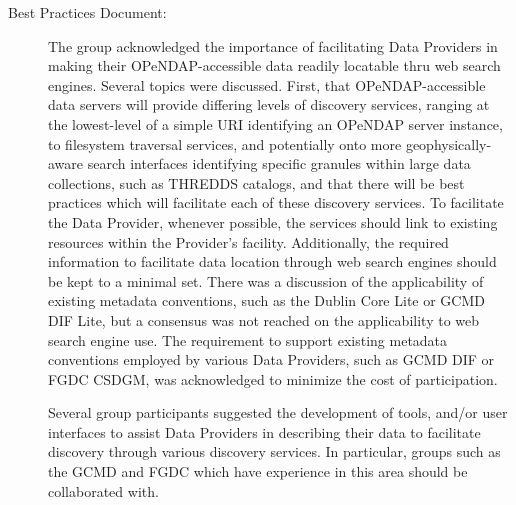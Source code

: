 \begin{description}
\item[Best Practices Document:]  The group acknowledged the importance of 
  facilitating Data Providers in making their OPeNDAP-accessible data
  readily locatable thru web search engines.  Several topics were
  discussed.  First, that OPeNDAP-accessible data servers will provide
  differing levels of discovery services, ranging at the lowest-level
  of a simple URI identifying an OPeNDAP server instance, to filesystem
  traversal services, and potentially onto more geophysically-aware 
  search interfaces identifying specific granules within large data 
  collections, such as THREDDS catalogs, and that there will be best 
  practices which will facilitate each of these discovery services.  
  To facilitate the Data Provider, whenever possible, the services 
  should link to existing resources within the Provider's facility.  
  Additionally, the required information to facilitate data location 
  through web search engines should be kept to a minimal set.  There 
  was a discussion of the applicability of existing metadata conventions, 
  such as the Dublin Core Lite or GCMD DIF Lite, but a consensus was 
  not reached on the applicability to web search engine use. The 
  requirement to support existing metadata conventions employed by 
  various Data Providers, such as GCMD DIF or FGDC CSDGM, was 
  acknowledged to minimize the cost of participation.

  Several group participants suggested the development of tools, and/or
  user interfaces to assist Data Providers in describing their data
  to facilitate discovery through various discovery services.  In 
  particular, groups such as the GCMD and FGDC which have experience
  in this area should be collaborated with.
\end{description}

%
%
%
%

